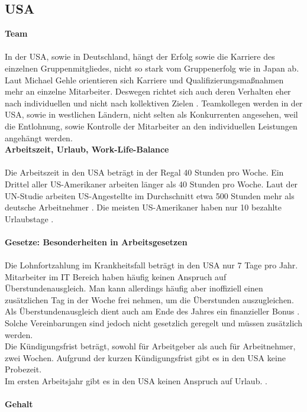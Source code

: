 	\subsection{USA}
	\textbf{Team}\\
	\\
	In der USA, sowie in Deutschland, hängt der Erfolg sowie die Karriere des einzelnen Gruppenmitgliedes, nicht so stark vom Gruppenerfolg wie in Japan ab. Laut Michael Gehle orientieren sich Karriere und Qualifizierungsmaßnahmen mehr an einzelne Mitarbeiter. Deswegen richtet sich auch deren Verhalten eher nach individuellen und nicht nach kollektiven Zielen \cite[233]{3LaenderVergl}. 
	Teamkollegen werden in der USA, sowie in westlichen Ländern, nicht selten als Konkurrenten angesehen, weil die Entlohnung, sowie Kontrolle der Mitarbeiter an den individuellen Leistungen angehängt werden. 
	 \\
		\textbf{Arbeitszeit, Urlaub, Work-Life-Balance}\\
		\\
	Die Arbeitszeit in den USA beträgt in der Regal 40 Stunden pro Woche. 
	Ein Drittel aller US-Amerikaner arbeiten länger als 40 Stunden pro Woche.
	Laut der UN-Studie arbeiten US-Angestellte im Durchschnitt etwa 500 Stunden mehr als deutsche Arbeitnehmer \cite{ArbeitsumgUSA}. Die meisten US-Amerikaner haben nur 10 bezahlte Urlaubstage \cite{InfoUSArbVertr}.\\ \\
	\textbf{Gesetze: Besonderheiten in Arbeitsgesetzen}\\
		\\
		Die Lohnfortzahlung im Krankheitsfall beträgt in den USA nur 7 Tage pro Jahr. 
		Mitarbeiter im IT Bereich haben häufig keinen Anspruch auf Überstundenausgleich. Man kann allerdings häufig aber inoffiziell einen zusätzlichen Tag in der Woche frei nehmen, um die Überstunden auszugleichen. Als Überstundenausgleich dient auch am Ende des Jahres ein finanzieller Bonus \cite{InfoUSArbVertr}.
		Solche Vereinbarungen sind jedoch nicht gesetzlich geregelt und müssen zusätzlich werden.\\
		Die Kündigungsfrist beträgt, sowohl für Arbeitgeber als auch für 
		Arbeitnehmer, zwei Wochen. Aufgrund der kurzen Kündigungsfrist gibt es in den USA keine Probezeit.\\
		Im ersten Arbeitsjahr gibt es in den USA keinen Anspruch auf Urlaub. \cite{USA_Tipps}.
		\\ \\
	\textbf{Gehalt}\\
